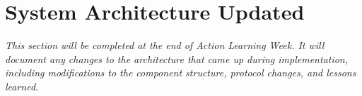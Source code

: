 \section{System Architecture Updated}
\label{sec:arch-updated}

\textit{This section will be completed at the end of Action Learning Week. It will document any changes to the architecture that came up during implementation, including modifications to the component structure, protocol changes, and lessons learned.}
